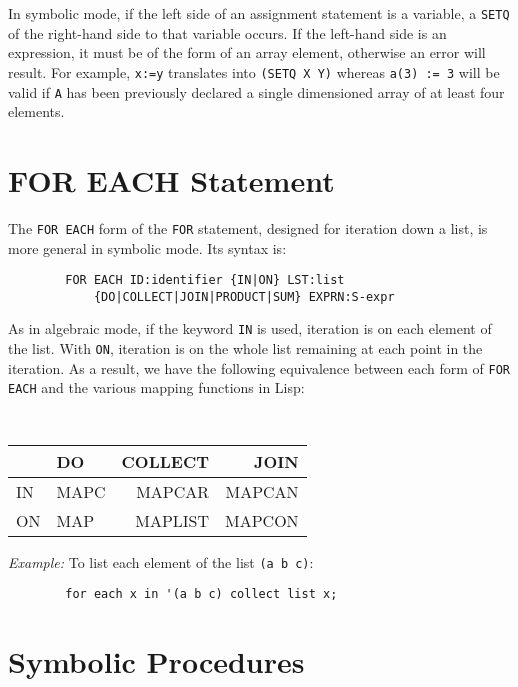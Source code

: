 In symbolic mode, if the left side of an assignment statement is a
variable, a \texttt{SETQ} of the right-hand side to that variable occurs.  If
the left-hand side is an expression, it must be of the form of an array
element, otherwise an error will result.  For example, \texttt{x:=y}
translates into \texttt{(SETQ X Y)} whereas \texttt{a(3) := 3} will be valid if
\texttt{A} has been previously declared a single dimensioned array of at
least four elements.

\section{FOR EACH Statement}

The \texttt{FOR EACH} form of the \texttt{FOR} statement, designed for iteration
down a list, is more general in symbolic mode.  Its syntax is:

\begin{verbatim}
        FOR EACH ID:identifier {IN|ON} LST:list
            {DO|COLLECT|JOIN|PRODUCT|SUM} EXPRN:S-expr
\end{verbatim}

As in algebraic mode, if the keyword \texttt{IN} is used, iteration is on
each element of the list.  With \texttt{ON}, iteration is on the whole list
remaining at each point in the iteration.  As a result, we have the
following equivalence between each form of \texttt{FOR EACH} and the various
mapping functions in Lisp:
\begin{center}
{\tt
\begin{tabular}{|l|lr r|} \hline
& DO & COLLECT & JOIN \\ \hline
        IN &   MAPC & MAPCAR & MAPCAN \\
        ON &   MAP &  MAPLIST & MAPCON \\ \hline
\end{tabular}}
\end{center}
\textit{Example:} To list each element of the list \texttt{(a b c)}:
\begin{verbatim}
        for each x in '(a b c) collect list x;
\end{verbatim}

\section{Symbolic Procedures}

